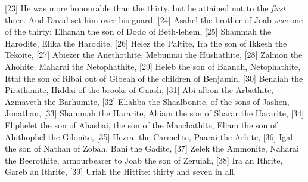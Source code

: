 [23] \textcolor[cmyk]{0.99998,1,0,0}{He was more honourable than the thirty, but he attained not to the \emph{first} three. And David set him over his guard.}
[24] \textcolor[cmyk]{0.99998,1,0,0}{Asahel the brother of Joab \emph{was} one of the thirty; Elhanan the son of Dodo of Beth-lehem,}
[25] \textcolor[cmyk]{0.99998,1,0,0}{Shammah the Harodite, Elika the Harodite,}
[26] \textcolor[cmyk]{0.99998,1,0,0}{Helez the Paltite, Ira the son of Ikkesh the Tekoite,}
[27] \textcolor[cmyk]{0.99998,1,0,0}{Abiezer the Anethothite, Mebunnai the Hushathite,}
[28] \textcolor[cmyk]{0.99998,1,0,0}{Zalmon the Ahohite, Maharai the Netophathite,}
[29] \textcolor[cmyk]{0.99998,1,0,0}{Heleb the son of Baanah, Netophathite, Ittai the son of Ribai out of Gibeah of the children of Benjamin,}
[30] \textcolor[cmyk]{0.99998,1,0,0}{Benaiah the Pirathonite, Hiddai of the brooks of Gaash,}
[31] \textcolor[cmyk]{0.99998,1,0,0}{Abi-albon the Arbathite, Azmaveth the Barhumite,}
[32] \textcolor[cmyk]{0.99998,1,0,0}{Eliahba the Shaalbonite, of the sons of Jashen, Jonathan,}
[33] \textcolor[cmyk]{0.99998,1,0,0}{Shammah the Hararite, Ahiam the son of Sharar the Hararite,}
[34] \textcolor[cmyk]{0.99998,1,0,0}{Eliphelet the son of Ahasbai, the son of the Maachathite, Eliam the son of Ahithophel the Gilonite,}
[35] \textcolor[cmyk]{0.99998,1,0,0}{Hezrai the Carmelite, Paarai the Arbite,}
[36] \textcolor[cmyk]{0.99998,1,0,0}{Igal the son of Nathan of Zobah, Bani the Gadite,}
[37] \textcolor[cmyk]{0.99998,1,0,0}{Zelek the Ammonite, Naharai the Beerothite, armourbearer to Joab the son of Zeruiah,}
[38] \textcolor[cmyk]{0.99998,1,0,0}{Ira an Ithrite, Gareb an Ithrite,}
[39] \textcolor[cmyk]{0.99998,1,0,0}{Uriah the Hittite: thirty and seven in all.}